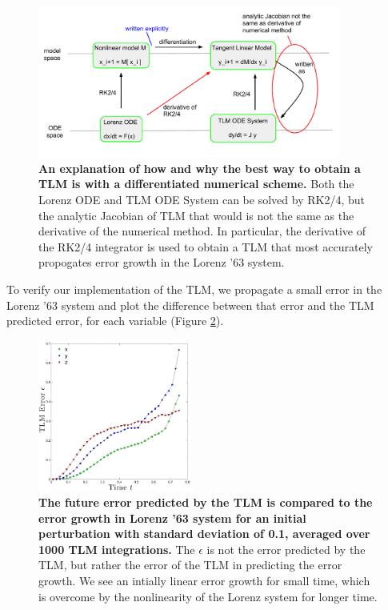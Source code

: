 \documentclass[10pt,letterpaper]{article}
\begin{document}
\begin{figure}[h]
  \centering
  \includegraphics[width=0.89\textwidth]{fig13_TLM-explanation.pdf}
  \caption[An explanation of how and why the best way to obtain a TLM is with a differentiated numerical scheme]{
\textbf{    An explanation of how and why the best way to obtain a TLM is with a differentiated numerical scheme.
}    Both the Lorenz ODE and TLM ODE System can be solved by RK2/4, but the analytic Jacobian of TLM that would is not the same as the derivative of the numerical method.
    In particular, the derivative of the RK2/4 integrator is used to obtain a TLM that most accurately propogates error growth in the Lorenz '63 system.
  }
  \label{fig:TLMscheme}
\end{figure}

To verify our implementation of the TLM, we propagate a small error in the Lorenz '63 system and plot the difference between that error and the TLM predicted error, for each variable (Figure \ref{fig:TLMverification}).

\begin{figure}[h]
  \centering
  \includegraphics[width=0.45\textwidth]{fig14_TLM-verification003_noname.pdf}
  \caption[The future error predicted by the TLM is compared to the error growth in Lorenz '63 system for an initial perturbation with standard deviation of 0.1, averaged over 1000 TLM integrations]{
\textbf{    The future error predicted by the TLM is compared to the error growth in Lorenz '63 system for an initial perturbation with standard deviation of 0.1, averaged over 1000 TLM integrations.
}    The $\epsilon$ is not the error predicted by the TLM, but rather the error of the TLM in predicting the error growth.
    We see an intially linear error growth for small time, which is overcome by the nonlinearity of the Lorenz system for longer time.
  }
  \label{fig:TLMverification}
\end{figure}
\end{document}
